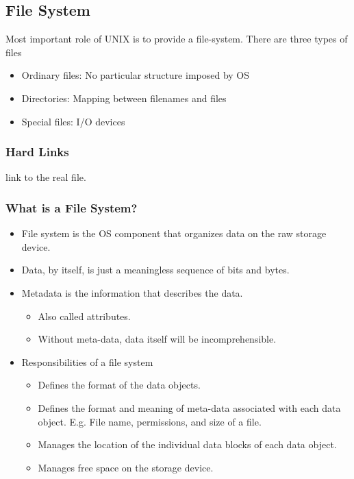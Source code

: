 \documentclass[12pt]{article}
\begin{document}
\subsection{File System}
Most important role of UNIX is to provide a file-system. There are three types of files
\begin{itemize}
    \item Ordinary files: No particular structure imposed by OS
    \item Directories: Mapping between filenames and files
    \item Special files: I/O devices
\end{itemize}
\subsubsection{Hard Links}
link to the real file.
\subsubsection{What is a File System?}
\begin{itemize}
    \item File system is the OS component that organizes data on the raw storage device. 
    \item Data, by itself, is just a meaningless sequence of bits and bytes.
    \item Metadata is the information that describes the data. \begin{itemize}
        \item Also called attributes. 
        \item Without meta-data, data itself will be incomprehensible.
    \end{itemize}
    \item Responsibilities of a file system \begin{itemize}
        \item Defines the format of the data objects. 
        \item Defines the format and meaning of meta-data associated with each data object. E.g. File name, permissions, and size of a file. 
        \item Manages the location of the individual data blocks of each data object. 
        \item Manages free space on the storage device.
    \end{itemize}
\end{itemize}
\end{document}
